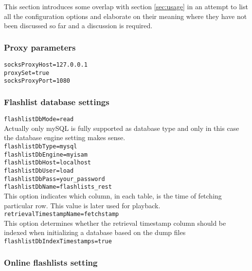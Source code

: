 This section introduces some overlap with section \ref{sec:usage} in an attempt to list all the configuration options and elaborate on their meaning where they have not been discussed so far and a discussion is required.

\subsubsection{Proxy parameters}

\texttt{socksProxyHost=127.0.0.1} \\
\texttt{proxySet=true} \\
\texttt{socksProxyPort=1080} \\

\subsubsection{Flashlist database settings}

\texttt{flashlistDbMode=read} \\

Actually only mySQL is fully supported as database type and only in this case the database engine setting makes sense. \\
\texttt{flashlistDbType=mysql} \\
\texttt{flashlistDbEngine=myisam} \\

\texttt{flashlistDbHost=localhost} \\
\texttt{flashlistDbUser=load} \\
\texttt{flashlistDbPass=your\_password} \\
\texttt{flashlistDbName=flashlists\_rest} \\

This option indicates which column, in each table, is the time of fetching particular row. This value is later used for playback. \\
\texttt{retrievalTimestampName=fetchstamp} \\

This option determines whether the retrieval timestamp column should be indexed when initializing a database based on the dump files \\
\texttt{flashlistDbIndexTimestamps=true} \\

\subsubsection{Online flashlists setting}

